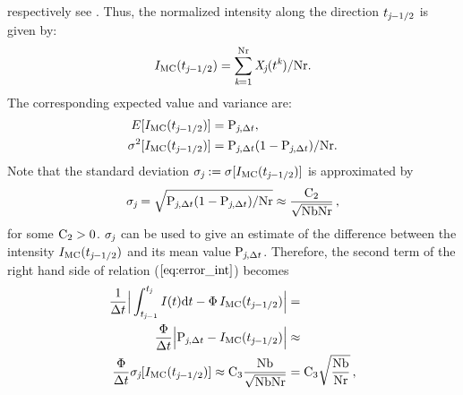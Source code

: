 respectively see \cite{zolotarev1997modern, rubinstein2016simulation}.
Thus, the normalized intensity along the direction $t_{\textit{j}-1/2}$ is given by:
\begin{equation}I_{\textrm{MC}}(t_{\textit{j}-1/2}) = \sum_{\textit{k}=1}^{\textrm{Nr}}\textit{X}_{\textit{j}}(t^{\textit{k}})/\textrm{Nr}.\end{equation}
The corresponding expected value and variance are:
\begin{subequations}
\begin{align}E[I_{\textrm{MC}}(t_{\textit{j}-1/2})]&=\textrm{P}_{\textit{j}, \Delta t},\\ \label{eq:variance_I}
\sigma^2[I_{\textrm{MC}}(t_{\textit{j}-1/2})] &= \textrm{P}_{\textit{j}, \Delta t}(1-\textrm{P}_{\textit{j}, \Delta t})/\textrm{Nr}.
\end{align}
\end{subequations}
Note that the standard deviation $\sigma_{\textit{j}}:=\sigma[I_{\textrm{MC}}(t_{\textit{j}-1/2})]$ is approximated by
\begin{equation}\label{sigma}
\sigma_{\textit{j}}= \sqrt{\textrm{P}_{\textit{j}, \Delta t}(1-\textrm{P}_{\textit{j}, \Delta t})/\textrm{Nr}}\approx \frac{\textrm{C}_2}{\sqrt{\textrm{Nb}\textrm{Nr}}}\,, \end{equation}
 for some $\textrm{C}_{2}>0$. $\sigma_{\textit{j}}$ can be used to give an estimate of the difference between the intensity $I_{\textrm{MC}}(t_{\textit{j}-1/2})$ and its mean value $\textrm{P}_{\textit{j}, \Delta t}$.
Therefore, the second term of the right hand side of relation ($\ref{eq:error_int}$) becomes
\begin{equation}\begin{aligned}
\frac{1}{\Delta t}\Big|\int_{t_{\textit{j}-1}}^{t_{\textit{j}}} I(t)\textrm{d}t -
\Phi\, I_{\textrm{MC}}(t_{\textit{j}-1/2})\Big| &=  \\
\frac{\Phi}{\Delta t}\Big|\textrm{P}_{\textit{j}, \Delta t} -I_{\textrm{MC}}(t_{\textit{j}-1/2})\Big| &\approx  \\
  \frac{\Phi}{\Delta t}
\sigma_{\textit{j}}[I_{\textrm{MC}}(t_{\textit{j}-1/2})]\approx\textrm{C}_3\frac{\textrm{Nb}}{\sqrt{\textrm{Nb}\textrm{Nr}}} & = \textrm{C}_3\sqrt{\frac{\textrm{Nb}}{\textrm{Nr}}}\,,
\end{aligned}
\end{equation}
